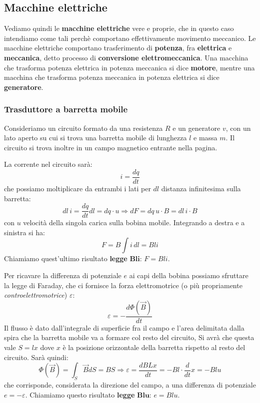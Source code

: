 \documentclass[a4paper,11pt]{article}
\begin{document}
\subsection{Macchine elettriche} 
Vediamo quindi le \textbf{macchine elettriche} vere e proprie, che in questo caso intendiamo come tali perchè comportano effettivamente movimento meccanico.
Le macchine elettriche comportano trasferimento di \textbf{potenza}, fra \textbf{elettrica} e \textbf{meccanica}, detto processo di \textbf{conversione elettromeccanica}.
Una macchina che trasforma potenza elettrica in potenza meccanica si dice \textbf{motore}, mentre una macchina che trasforma potenza meccanica in potenza elettrica si dice \textbf{generatore}.

\subsubsection{Trasduttore a barretta mobile}
Consideriamo un circuito formato da una resistenza $R$ e un generatore $v$, con un lato aperto su cui si trova una barretta mobile di lunghezza $l$ e massa $m$.
Il circuito si trova inoltre in un campo magnetico entrante nella pagina.

La corrente nel circuito sarà:
$$
i = \frac{dq}{dt}
$$
che possiamo moltiplicare da entrambi i lati per $dl$ distanza infinitesima sulla barretta:
$$
dl \, i = \frac{dq}{dt} dl = dq \cdot u \Rightarrow dF = dq \, u \cdot B = dl \, i \cdot  B
$$
con $u$ velocità della singola carica sulla bobina mobile. Integrando a destra e a sinistra si ha:
$$
F = B \int i \, dl = Bli  
$$
Chiamiamo quest'ultimo risultato \textbf{legge} $\boldsymbol{Bli}$: $F = Bli$.

Per ricavare la differenza di potenziale $e$ ai capi della bobina possiamo sfruttare la legge di Faraday, che ci fornisce la forza elettromotrice (o più propriamente \textit{controelettromotrice}) $\varepsilon$:
$$
\varepsilon = -\frac{d \Phi(\vec{B})}{dt}
$$
Il flusso è dato dall'integrale di superficie fra il campo e l'area delimitata dalla spira che la barretta mobile va a formare col resto del circuito,
Si avrà che questa vale $S = lx$ dove $x$ è la posizione orizzontale della barretta rispetto al resto del circuito.
Sarà quindi:
$$
\Phi(\vec{B}) = \int_S \vec{B} dS = BS \Rightarrow \varepsilon = \frac{d BL x}{dt} = - Bl \cdot \frac{d}{dt}x = -Bl u
$$
che corrisponde, considerata la direzione del campo, a una differenza di potenziale $e = -\varepsilon$.
Chiamiamo questo risultato \textbf{legge} $\boldsymbol{Blu}$: $e = Bl u$.
\end{document}
